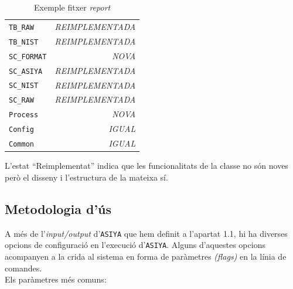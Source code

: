 \documentclass[11pt,a4paper]{article}
\begin{document}
\begin{table}[H]
{\begin{tabular}{l  r}
\texttt{TB\_RAW}       & \textit{REIMPLEMENTADA}           \\
\texttt{TB\_NIST}      & \textit{REIMPLEMENTADA}           \\
\texttt{SC\_FORMAT}    & \textit{NOVA}           \\
\texttt{SC\_ASIYA}     & \textit{REIMPLEMENTADA}           \\
\texttt{SC\_NIST}      & \textit{REIMPLEMENTADA}           \\
\texttt{SC\_RAW}       & \textit{REIMPLEMENTADA}               \\
\texttt{Process}       & \textit{NOVA}           \\
\texttt{Config}        & \textit{IGUAL}          \\
\texttt{Common}        & \textit{IGUAL}    		\\     
\hline
\end{tabular}}
\caption{Exemple fitxer \textit{report}}
\end{table}

L'estat ``Reimplementat'' indica que les funcionalitats de la classe no són noves però el disseny i l'estructura de la mateixa sí.

\subsection{Metodologia d'ús}
A més de l'\textit{input/output} d'\texttt{ASIYA} que hem definit a l'apartat 1.1, hi ha diverses opcions de configuració en l'execució d'\texttt{ASIYA}. Alguns d'aquestes opcions acompanyen a la crida al sistema en forma de paràmetres \textit{(flags)} en la línia de comandes.
\\

Els paràmetres més comuns:
\end{document}
